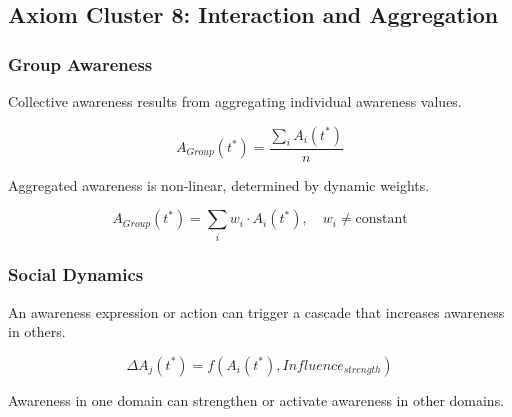 \subsection{Axiom Cluster 8: Interaction and Aggregation}
\label{subsec:axioms-aggregation}

\subsubsection{Group Awareness}

\begin{axiom}
\label{ax:awx-a76}
Collective awareness results from aggregating individual awareness values.
\end{axiom}

\begin{equation}
A_{Group}(t^*) = \frac{\sum_i A_i(t^*)}{n}
\end{equation}

\begin{axiom}
\label{ax:awx-a77}
Aggregated awareness is non-linear, determined by dynamic weights.
\end{axiom}

\begin{equation}
A_{Group}(t^*) = \sum_i w_i \cdot A_i(t^*), \quad w_i \neq \text{constant}
\end{equation}

\subsubsection{Social Dynamics}

\begin{axiom}
\label{ax:awx-a78}
An awareness expression or action can trigger a cascade that increases 
awareness in others.
\end{axiom}

\begin{equation}
\Delta A_j(t^*) = f(A_i(t^*), Influence_{strength})
\end{equation}

\begin{axiom}
\label{ax:awx-a79}
Awareness in one domain can strengthen or activate awareness in other domains.
\end{axiom}

